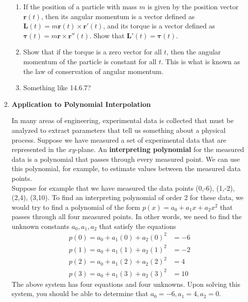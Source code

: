 \documentclass{article}
\begin{document}
\begin{enumerate}
\begin{enumerate}
\item If the position of a particle with mass $m$ is given by the position vector $\mathbf{r}(t)$, then its angular momentum is a vector defined as $\mathbf{L}(t) = m\mathbf{r}(t)\times \mathbf{r}'(t)$, and its torque is a vector defined as $\mathbf{\tau}(t) = m\mathbf{r} \times \mathbf{r}''(t)$.  Show that $\mathbf{L}'(t) = \mathbf{\tau}(t)$.
\item Show that if the torque is a zero vector for all $t$, then the angular momentum of the particle is constant for all $t$. This is what is known as the law of conservation of angular momentum.
\item Something like 14.6.7? 
\end{enumerate}
\item \textbf{Application to Polynomial Interpolation}

In many areas of engineering, experimental data is collected that must be analyzed to extract parameters that tell us something about a physical process. Suppose we have measured a set of experimental data that are represented in the $xy$-plane. An \textbf{interpreting polynomial} for the measured data is a polynomial that passes through every measured point. We can use this polynomial, for example, to estimate values between the measured data points. \\

Suppose for example that we have measured the data points (0,-6), (1,-2), (2,4), (3,10). To find an interpreting polynomial of order 2 for these data, we would try to find a polynomial of the form $p(x) = a_0+a_1x+a_2x^2$ that passes through all four measured points. In other words, we need to find the unknown constants $a_0, a_1, a_2$ that satisfy the equations
\begin{align*}
p(0) = a_0+a_1(0)+a_2(0)^2 &= -6 \\
p(1) = a_0+a_1(1)+a_2(1)^2 &= -2 \\
p(2) = a_0+a_1(2)+a_2(2)^2 &= 4  \\
p(3) = a_0+a_1(3)+a_2(3)^2 &= 10 
\end{align*}
The above system has four equations and four unknowns. Upon solving this system, you should be able to determine that $a_0 = -6, a_1 = 4, a_2=0$.\\


\end{enumerate}
\end{document}
